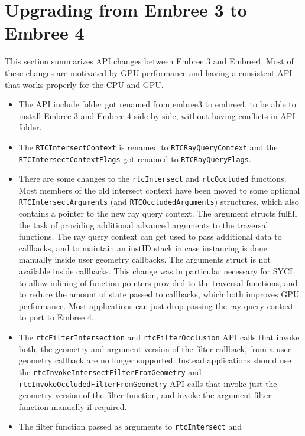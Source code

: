 \chapter{Upgrading from Embree 3 to Embree
4}\label{upgrading-from-embree-3-to-embree-4}

This section summarizes API changes between Embree 3 and Embree4. Most
of these changes are motivated by GPU performance and having a
consistent API that works properly for the CPU and GPU.

\begin{itemize}
\item
  The API include folder got renamed from embree3 to embree4, to be able
  to install Embree 3 and Embree 4 side by side, without having
  conflicts in API folder.
\item
  The \texttt{RTCIntersectContext} is renamed to
  \texttt{RTCRayQueryContext} and the \texttt{RTCIntersectContextFlags}
  got renamed to \texttt{RTCRayQueryFlags}.
\item
  There are some changes to the \texttt{rtcIntersect} and
  \texttt{rtcOccluded} functions. Most members of the old intersect
  context have been moved to some optional
  \texttt{RTCIntersectArguments} (and \texttt{RTCOccludedArguments})
  structures, which also contains a pointer to the new ray query
  context. The argument structs fulfill the task of providing additional
  advanced arguments to the traversal functions. The ray query context
  can get used to pass additional data to callbacks, and to maintain an
  instID stack in case instancing is done manually inside user geometry
  callbacks. The arguments struct is not available inside callbacks.
  This change was in particular necessary for SYCL to allow inlining of
  function pointers provided to the traversal functions, and to reduce
  the amount of state passed to callbacks, which both improves GPU
  performance. Most applications can just drop passing the ray query
  context to port to Embree 4.
\item
  The \texttt{rtcFilterIntersection} and \texttt{rtcFilterOcclusion} API
  calls that invoke both, the geometry and argument version of the
  filter callback, from a user geometry callback are no longer
  supported. Instead applications should use the
  \texttt{rtcInvokeIntersectFilterFromGeometry} and
  \texttt{rtcInvokeOccludedFilterFromGeometry} API calls that invoke
  just the geometry version of the filter function, and invoke the
  argument filter function manually if required.
\item
  The filter function passed as arguments to \texttt{rtcIntersect} and

\end{itemize}
